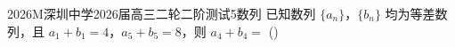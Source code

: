 
\begin{problem}{2026}{M}{深圳中学2026届高三二轮二阶测试}{5}{数列}
已知数列 $\{a_n\}$，$\{b_n\}$ 均为等差数列，且 $a_1+b_1=4$，$a_5+b_5=8$，则 $a_4+b_4=$ (\hspace{1cm})

\begin{choices}
\end{choices}
\end{problem}